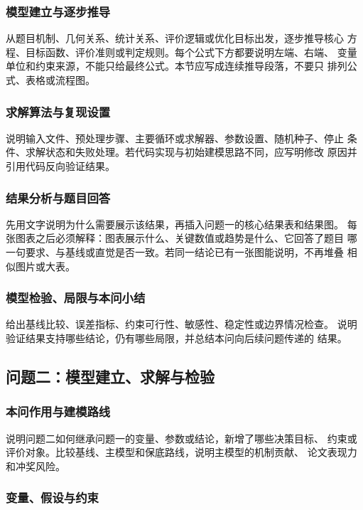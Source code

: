 \documentclass[12pt,a4paper]{ctexart}
\begin{document}
\subsubsection{模型建立与逐步推导}

从题目机制、几何关系、统计关系、评价逻辑或优化目标出发，逐步推导核心
方程、目标函数、评价准则或判定规则。每个公式下方都要说明左端、右端、
变量单位和约束来源，不能只给最终公式。本节应写成连续推导段落，不要只
排列公式、表格或流程图。

\subsubsection{求解算法与复现设置}

说明输入文件、预处理步骤、主要循环或求解器、参数设置、随机种子、停止
条件、求解状态和失败处理。若代码实现与初始建模思路不同，应写明修改
原因并引用代码反向验证结果。

\subsubsection{结果分析与题目回答}

先用文字说明为什么需要展示该结果，再插入问题一的核心结果表和结果图。
每张图表之后必须解释：图表展示什么、关键数值或趋势是什么、它回答了题目
哪一句要求、与基线或直觉是否一致。若同一结论已有一张图能说明，不再堆叠
相似图片或大表。

\subsubsection{模型检验、局限与本问小结}

给出基线比较、误差指标、约束可行性、敏感性、稳定性或边界情况检查。
说明验证结果支持哪些结论，仍有哪些局限，并总结本问向后续问题传递的
结果。

\subsection{问题二：模型建立、求解与检验}

\subsubsection{本问作用与建模路线}

说明问题二如何继承问题一的变量、参数或结论，新增了哪些决策目标、
约束或评价对象。比较基线、主模型和保底路线，说明主模型的机制贡献、
论文表现力和冲奖风险。

\subsubsection{变量、假设与约束}
\end{document}
